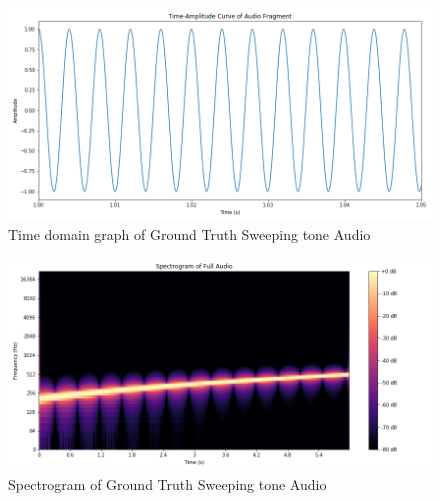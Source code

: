 \documentclass{ioereport}
\begin{document}
    \begin{figure}[H]
        \centering
        \includegraphics[width=\linewidth]{assets/audio_results/sweeping_tone200-500hztime.png}
        \caption{Time domain graph of Ground Truth Sweeping tone Audio}
        \label{fig:gt-sweeping-time}
    \end{figure}
    \begin{figure}[H]
        \centering
        \includegraphics[width=\linewidth]{assets/audio_results/sweeping_tone200-500hzspec.png}
        \caption{Spectrogram of Ground Truth Sweeping tone Audio}
        \label{fig:gt-sweeping-spec}
    \end{figure}
    
\end{document}
